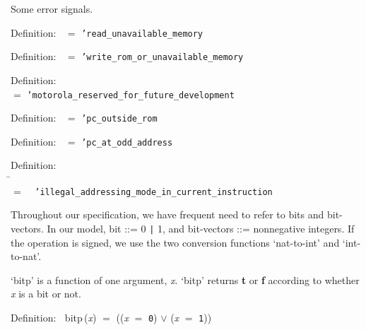  Some error signals.
\begin{tabbing}{\sc Definition}:$\;\;$
{} $=$ {\tt{'}}{\tt{read\_unavailable\_memory}}
\end{tabbing}

\begin{tabbing}{\sc Definition}:$\;\;$
{} $=$ {\tt{'}}{\tt{write\_rom\_or\_unavailable\_memory}}
\end{tabbing}

\begin{tabbing}{\sc Definition}: \\  
{} $=$ {\tt{'}}{\tt{motorola\_reserved\_for\_future\_development}}
\end{tabbing}

\begin{tabbing}{\sc Definition}:$\;\;$
{} $=$ {\tt{'}}{\tt{pc\_outside\_rom}}
\end{tabbing}

\begin{tabbing}{\sc Definition}:$\;\;$
{} $=$ {\tt{'}}{\tt{pc\_at\_odd\_address}}
\end{tabbing}

\begin{tabbing}{\sc Definition}: \\  
\= \\ 
$=$$\;\;\;\;${\tt{'}}{\tt{illegal\_addressing\_mode\_in\_current\_instruction}}\-
\end{tabbing}

 Throughout our specification, we have frequent need to refer to bits and
 bit-vectors.  In our model, bit ::= 0 {\tt |} 1, and bit-vectors ::= nonnegative
 integers.  If the operation is signed, we use the two conversion functions
 `nat-to-int' and `int-to-nat'.

 `bitp' is a function of one argument, {\it{x\/}}.  `bitp' returns {\bf{t}} or {\bf{f}}
 according to whether {\it{x\/}} is a bit or not.
\begin{tabbing}{\sc Definition}:$\;\;$
{\rm{bitp}}\,({\it{x\/}}) $=$ (({\it{x\/}} $=$ {\tt{0}}) $\vee$ ({\it{x\/}} $=$ {\tt{1}}))
\end{tabbing}

